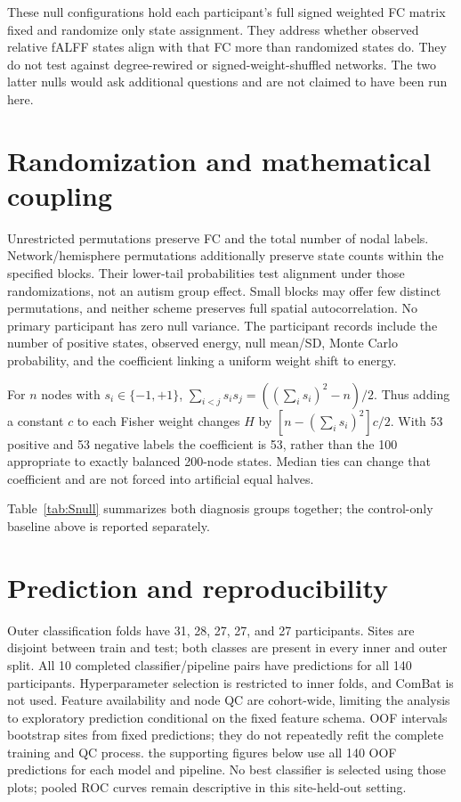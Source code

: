 \documentclass[10pt,letterpaper]{article}
\begin{document}
These null configurations hold each participant's full signed weighted FC matrix
fixed and randomize only state assignment. They address whether observed relative
fALFF states align with that FC more than randomized states do. They do not test
against degree-rewired or signed-weight-shuffled networks. The two latter nulls
would ask additional questions and are not claimed to have been run here.

\section*{Randomization and mathematical coupling}
Unrestricted permutations preserve FC and the total number of nodal labels.
Network/hemisphere permutations additionally preserve state counts within the
specified blocks. Their lower-tail probabilities test alignment under those
randomizations, not an autism group effect. Small blocks may offer few distinct
permutations, and neither scheme preserves full spatial autocorrelation. No
primary participant has zero null variance. The participant records include the
number of positive states, observed energy, null mean/SD, Monte Carlo probability,
and the coefficient linking a uniform weight shift to energy.

For $n$ nodes with $s_i\in\{-1,+1\}$,
$\sum_{i<j}s_i s_j=((\sum_i s_i)^2-n)/2$. Thus adding a constant $c$ to each
Fisher weight changes $H$ by $[n-(\sum_i s_i)^2]c/2$. With 53 positive and
53 negative labels the coefficient is 53, rather than the 100 appropriate to
exactly balanced 200-node states. Median ties can change that coefficient and
are not forced into artificial equal halves.

Table~\ref{tab:Snull} summarizes both diagnosis groups together; the control-only
baseline above is reported separately.


\section*{Prediction and reproducibility}
Outer classification folds have 31, 28, 27, 27, and 27 participants. Sites are
disjoint between train and test; both classes are present in every inner and
outer split. All 10 completed classifier/pipeline pairs have predictions for all 140
participants. Hyperparameter selection is restricted to inner folds, and ComBat
is not used. Feature availability and node QC are cohort-wide, limiting the
analysis to exploratory prediction conditional on the fixed feature schema.
OOF intervals bootstrap sites from fixed predictions; they do not repeatedly
refit the complete training and QC process.
the supporting figures below use all 140 OOF predictions for
each model and pipeline. No best classifier is selected using those plots;
pooled ROC curves remain descriptive in this site-held-out setting.
\end{document}

